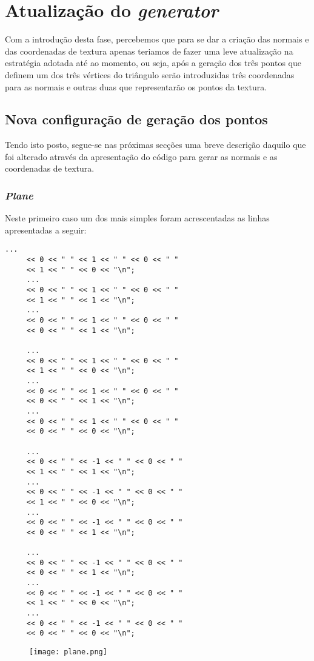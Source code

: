 \documentclass[11pt,a4paper]{report}
\begin{document}
\chapter{Atualização do \emph{generator}}

Com a introdução desta fase, percebemos que para se dar a criação das normais e das coordenadas de textura apenas teriamos de fazer uma leve atualização na estratégia adotada até ao momento, ou seja, após a geração dos três pontos que definem um dos três vértices do triângulo serão introduzidas três coordenadas para as normais e outras duas que representarão os pontos da textura.

\section{Nova configuração de geração dos pontos}

Tendo isto posto, segue-se nas próximas secções uma breve descrição daquilo que foi alterado através da apresentação do código para gerar as normais e as coordenadas de textura.
\newpage
\subsection{\emph{Plane}}

Neste primeiro caso um dos mais simples foram acrescentadas as linhas apresentadas a seguir:

\begin{multicols}{2}
\begin{lstlisting}[style = code]
     ...
     << 0 << " " << 1 << " " << 0 << " "
     << 1 << " " << 0 << "\n";
     ...
     << 0 << " " << 1 << " " << 0 << " "
     << 1 << " " << 1 << "\n";
     ...
     << 0 << " " << 1 << " " << 0 << " "
     << 0 << " " << 1 << "\n";

     ...
     << 0 << " " << 1 << " " << 0 << " "
     << 1 << " " << 0 << "\n";
     ...
     << 0 << " " << 1 << " " << 0 << " "
     << 0 << " " << 1 << "\n";
     ...
     << 0 << " " << 1 << " " << 0 << " "
     << 0 << " " << 0 << "\n";

     ...
     << 0 << " " << -1 << " " << 0 << " "
     << 1 << " " << 1 << "\n";
     ...
     << 0 << " " << -1 << " " << 0 << " "
     << 1 << " " << 0 << "\n";
     ...
     << 0 << " " << -1 << " " << 0 << " "
     << 0 << " " << 1 << "\n";

     ...
     << 0 << " " << -1 << " " << 0 << " "
     << 0 << " " << 1 << "\n";
     ...
     << 0 << " " << -1 << " " << 0 << " "
     << 1 << " " << 0 << "\n";
     ...
     << 0 << " " << -1 << " " << 0 << " "
     << 0 << " " << 0 << "\n";
\end{lstlisting}
\end{multicols}
\begin{figure}[h]
    \centering
    \texttt{[image: plane.png]}
\end{figure}
\end{document}

